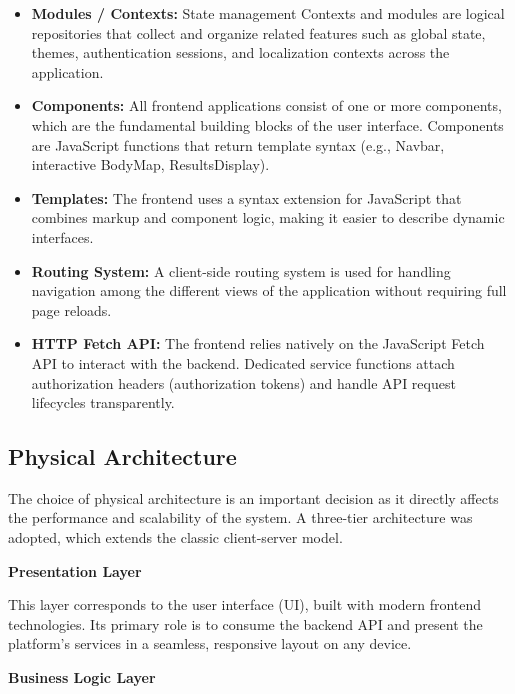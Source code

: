 \begin{itemize}
	\item \textbf{Modules / Contexts:} State management Contexts and modules are
	logical repositories that collect and organize related
	features such as global state, themes, authentication sessions, and localization contexts across the application.
	
	\item \textbf{Components:} All frontend applications consist of one
	or more components, which are the fundamental building blocks
	of the user interface. Components are JavaScript functions that return
	template syntax (e.g., Navbar, interactive BodyMap, ResultsDisplay).
	
	\item \textbf{Templates:} The frontend uses a syntax extension
	for JavaScript that combines markup and component logic,
	making it easier to describe dynamic interfaces.
	
	\item \textbf{Routing System:} A client-side routing system is used
	for handling navigation among the different views of the
	application without requiring full page reloads.
	
	\item \textbf{HTTP Fetch API:} The frontend relies natively on the JavaScript Fetch API to interact with the backend. Dedicated service functions attach authorization headers (authorization tokens) and handle API request lifecycles transparently.
\end{itemize}

\subsection{Physical Architecture}
The choice of physical architecture is an important decision as it
directly affects the performance and scalability of the system. A three-tier architecture was adopted, which extends the classic client-server model.

\textbf{Presentation Layer}

This layer corresponds to the user interface (UI), built with modern frontend technologies. Its primary role is to consume the backend API and present the platform's services in a seamless, responsive layout on any device.

\textbf{Business Logic Layer}

